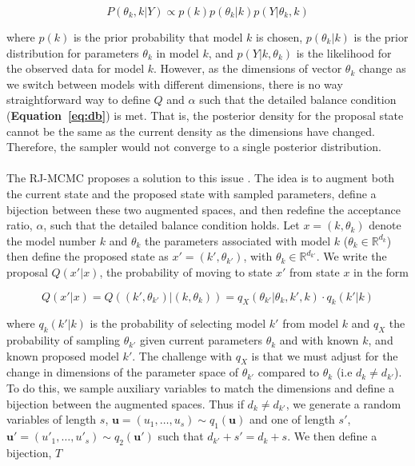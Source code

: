 \begin{equation}
P(\theta_k, k | Y) \propto p(k)p(\theta_k|k)p(Y | \theta_k, k)
\end{equation}


where $p(k)$ is the prior probability that model $k$ is chosen, $p(\theta_k|k)$ is the prior distribution for parameters $\theta_k$ in model $k$, and $p(Y| k, \theta_k) $ is the likelihood for the observed data for model $k$. However, as the dimensions of vector $\theta_k$ change as we switch between models with different dimensions, there is no way straightforward way to define $Q$ and $\alpha$ such that the detailed balance condition (\textbf{Equation~\ref{eq:db}}) is met. That is, the posterior density for the proposal state cannot be the same as the current density as the dimensions have changed. Therefore, the sampler would not converge to a single posterior distribution. 

\paragraph{}The RJ-MCMC proposes a solution to this issue \cite{Green1995-kh}. The idea is to augment both the current state and the proposed state with sampled parameters, define a bijection between these two augmented spaces, and then redefine the acceptance ratio, $\alpha$, such that the detailed balance condition holds.  Let $x = (k, \theta_k)$ denote the model number $k$ and $\theta_k$ the parameters associated with model $k$ ($\theta_k \in \mathbb{R}^{d_k}$) then define the proposed state as $x' = (k', \theta_{k'})$, with $\theta_k \in \mathbb{R}^{d_{k'}}$. We write the proposal $Q(x' | x)$, the probability of moving to state $x'$ from state $x$ in the form

\begin{equation}
 Q(x'| x) = Q\left((k', \theta_{k'}) | (k, \theta_k) \right) = q_X(  \theta_{k'} |  \theta_k, k', k) \cdot q_k(k' | k)
\end{equation}

where $q_k(k' | k)$ is  the probability of selecting model $k'$ from model $k$ and $q_X$ the probability of sampling $\theta_{k'}$ given current parameters $\theta_k$ and with known  $k$, and known proposed model $k'$. The challenge with $q_X$ is that we must adjust for the change in dimensions of the parameter space of $\theta_{k'}$ compared to $\theta_k$ (i.e $d_k \neq d_{k'}$). To do this, we sample auxiliary variables to match the dimensions and define a bijection between the augmented spaces. Thus if $d_k \neq d_{k'}$, we generate a random variables of length $s$, $\mathbf{u} = (u_1, \dots, u_s) \sim q_1(\mathbf{u})$ and one of length $s'$, $\mathbf{u'} = (u'_1, \dots, u'_s) \sim q_2(\mathbf{u}')$ such that $d_{k'} + s'= d_k + s$. We then define a bijection, $T$

